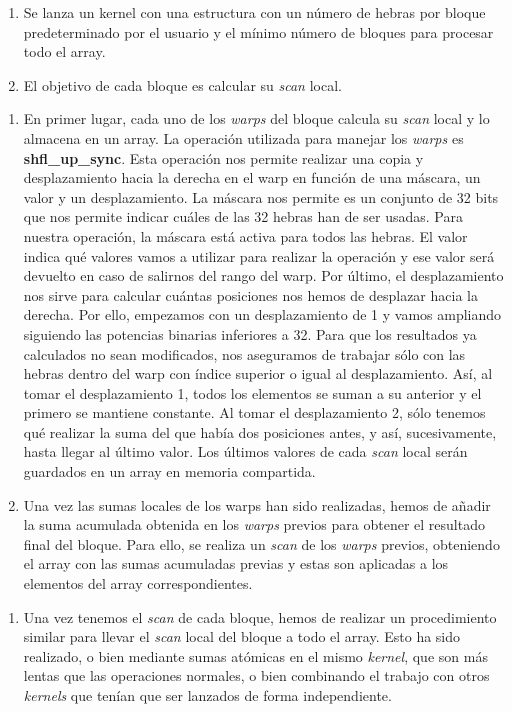 \begin{enumerate}
    \item Se lanza un kernel con una estructura con un número de hebras por bloque predeterminado por el usuario y el mínimo número de bloques para procesar todo el array.\\
    \item El objetivo de cada bloque es calcular su \textit{scan} local.
\end{enumerate}
\begin{enumerate}[{2.}1]
    \item En primer lugar, cada uno de los \textit{warps} del bloque calcula su \textit{scan} local y lo almacena en un array. La operación utilizada para manejar los \textit{warps} es \textbf{shfl\_up\_sync}. Esta operación nos permite realizar una copia y desplazamiento hacia la derecha en el warp en función de una máscara, un valor y un desplazamiento. La máscara nos permite es un conjunto de 32 bits que nos permite indicar cuáles de las 32 hebras han de ser usadas. Para nuestra operación, la máscara está activa para todos las hebras. El valor indica qué valores vamos a utilizar para realizar la operación y ese valor será devuelto en caso de salirnos del rango del warp. Por último, el desplazamiento nos sirve para calcular cuántas posiciones nos hemos de desplazar hacia la derecha. Por ello, empezamos con un desplazamiento de 1 y vamos ampliando siguiendo las potencias binarias inferiores a 32. Para que los resultados ya calculados no sean modificados, nos aseguramos de trabajar sólo con las hebras dentro del warp con índice superior o igual al desplazamiento. Así, al tomar el desplazamiento 1, todos los elementos se suman a su anterior y el primero se mantiene constante. Al tomar el desplazamiento 2, sólo tenemos qué realizar la suma del que había dos posiciones antes, y así, sucesivamente, hasta llegar al último valor. Los últimos valores de cada \textit{scan} local serán guardados en un array en memoria compartida.
    \item Una vez las sumas locales de los warps han sido realizadas, hemos de añadir la suma acumulada obtenida en los \textit{warps} previos para obtener el resultado final del bloque. Para ello, se realiza un \textit{scan} de los \textit{warps} previos, obteniendo el array con las sumas acumuladas previas y estas son aplicadas a los elementos del array correspondientes.\\
\end{enumerate}
\begin{enumerate}[3]
    \item Una vez tenemos el \textit{scan} de cada bloque, hemos de realizar un procedimiento similar para llevar el \textit{scan} local del bloque a todo el array. Esto ha sido realizado, o bien mediante sumas atómicas en el mismo \textit{kernel}, que son más lentas que las operaciones normales, o bien combinando el trabajo con otros \textit{kernels} que tenían que ser lanzados de forma independiente.

\end{enumerate}



